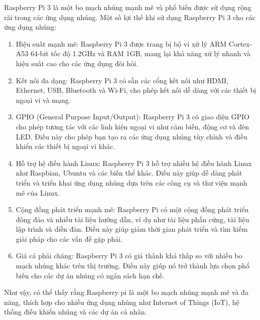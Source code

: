 Raspberry Pi 3 là một bo mạch nhúng mạnh mẽ và phổ biến được sử dụng rộng rãi trong các ứng dụng nhúng. Một số lợi thế khi sử dụng Raspberry Pi 3 cho các ứng dụng nhúng:

\begin{enumerate}
	\item Hiệu suất mạnh mẽ: Raspberry Pi 3 được trang bị bộ vi xử lý ARM Cortex-A53 64-bit tốc độ 1.2GHz và RAM 1GB, mang lại khả năng xử lý nhanh và hiệu suất cao cho các ứng dụng đòi hỏi.
	
	\item Kết nối đa dạng: Raspberry Pi 3 có sẵn các cổng kết nối như HDMI, Ethernet, USB, Bluetooth và Wi-Fi, cho phép kết nối dễ dàng với các thiết bị ngoại vi và mạng.
	
	\item GPIO (General Purpose Input/Output): Raspberry Pi 3 có giao diện GPIO cho phép tương tác với các linh kiện ngoại vi như cảm biến, động cơ và đèn LED. Điều này cho phép bạn tạo ra các ứng dụng nhúng tùy chỉnh và điều khiển các thiết bị ngoại vi khác.
	
	\item Hỗ trợ hệ điều hành Linux: Raspberry Pi 3 hỗ trợ nhiều hệ điều hành Linux như Raspbian, Ubuntu và các biến thể khác. Điều này giúp dễ dàng phát triển và triển khai ứng dụng nhúng dựa trên các công cụ và thư viện mạnh mẽ của Linux.
	
	\item Cộng đồng phát triển mạnh mẽ: Raspberry Pi có một cộng đồng phát triển đông đảo và nhiều tài liệu hướng dẫn, ví dụ như tài liệu phần cứng, tài liệu lập trình và diễn đàn. Điều này giúp giảm thời gian phát triển và tìm kiếm giải pháp cho các vấn đề gặp phải.
	
	\item Giá cả phải chăng: Raspberry Pi 3 có giá thành khá thấp so với nhiều bo mạch nhúng khác trên thị trường. Điều này giúp nó trở thành lựa chọn phổ biến cho các dự án nhúng có ngân sách hạn chế.
\end{enumerate}

Như vậy, có thể thấy rằng Raspberry pi là một bo mạch nhúng mạnh mẽ và đa năng, thích hợp cho nhiều ứng dụng nhúng như Internet of Things (IoT), hệ thống điều khiển nhúng và các dự án cá nhân. 